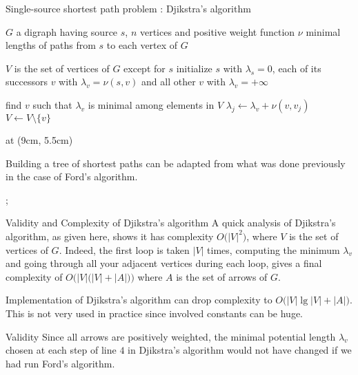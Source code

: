 \documentclass[32pt,aspectratio=169, handout]{beamer}
\begin{document}
\begin{frame}{Single-source shortest path problem : Djikstra's algorithm}
  \small{
    \begin{algorithmic}[1]
      \Require $G$ a digraph having source $s$, $n$
      vertices and positive weight function $\nu$
      \Ensure minimal lengths of paths from $s$ to each vertex of $G$

      \State $V$ is the set of vertices of $G$ except for $s$
      \State initialize $s$ with $\lambda_s =0$, each of its
      successors $v$ with $\lambda_v = \nu(s, v)$
      \Statex and all other $v$ with $\lambda_v = +\infty$

      \State find $v$ such that $\lambda_v$ is minimal among elements in $V$
      \State $\lambda_j \gets \lambda_v + \nu(v, v_j)$
      \EndIf
      \EndFor
      \State $V \gets V\setminus \{v\}$
      \EndWhile

    \end{algorithmic}
  }
  \tikzoverlay[text width=5cm] at (9cm, 5.5cm) {
    \begin{tcolorbox}[
      enhanced,
      parbox = false,
      colback=mLightBrown!10!white,
      colframe=mLightBrown,
      arc=0mm,
      ]
      Building a tree of shortest paths can be adapted from what was
      done previously in the case of Ford's algorithm.
    \end{tcolorbox}%
  };
\end{frame}

\begin{frame}{Validity and Complexity of Djikstra's algorithm}
  A quick analysis of Djikstra's algorithm, as given here, shows it
  has complexity $O\big(|V|^2\big)$, where $V$ is the set of vertices
  of $G$. Indeed, the first loop is taken $|V|$ times, computing the
  minimum $\lambda_v$ and going through all your adjacent vertices
  during each loop, gives a final complexity of
  $O\Big(|V|\big(|V|+|A|\big)\Big)$ where $A$ is the set of arrows of
  $G$.
  \begin{rem}
    Implementation of Djikstra's algorithm can drop complexity to
    $O\big(|V|\lg|V| + |A|\big)$. This is not very used in practice
    since involved constants can be huge.
  \end{rem}
  \begin{halfshyblock}{Validity}
    Since all arrows are positively weighted, the minimal potential
    length $\lambda_v$ chosen at each step of line $4$ in Djikstra's
    algorithm would not have changed if we had run Ford's algorithm.
  \end{halfshyblock}
\end{frame}
\end{document}

